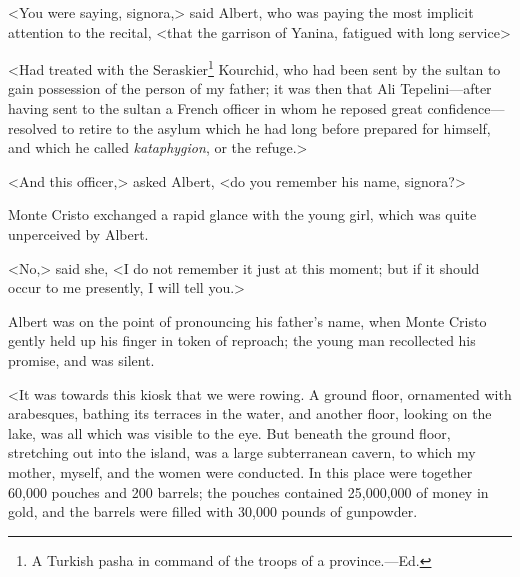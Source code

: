  <You were saying, signora,> said Albert, who was paying the most implicit attention to the recital, <that the garrison of Yanina, fatigued with long service\longdash> 

 <Had treated with the Seraskier\footnote{A Turkish pasha in command of the troops of a province.—Ed. } Kourchid, who had been sent by the sultan to gain possession of the person of my father; it was then that Ali Tepelini—after having sent to the sultan a French officer in whom he reposed great confidence—resolved to retire to the asylum which he had long before prepared for himself, and which he called \textit{kataphygion}, or the refuge.> 

 <And this officer,> asked Albert, <do you remember his name, signora?> 

 Monte Cristo exchanged a rapid glance with the young girl, which was quite unperceived by Albert. 

 <No,> said she, <I do not remember it just at this moment; but if it should occur to me presently, I will tell you.> 

 Albert was on the point of pronouncing his father's name, when Monte Cristo gently held up his finger in token of reproach; the young man recollected his promise, and was silent. 

<It was towards this kiosk that we were rowing. A ground floor, ornamented with arabesques, bathing its terraces in the water, and another floor, looking on the lake, was all which was visible to the eye. But beneath the ground floor, stretching out into the island, was a large subterranean cavern, to which my mother, myself, and the women were conducted. In this place were together 60,000 pouches and 200 barrels; the pouches contained 25,000,000 of money in gold, and the barrels were filled with 30,000 pounds of gunpowder. 

